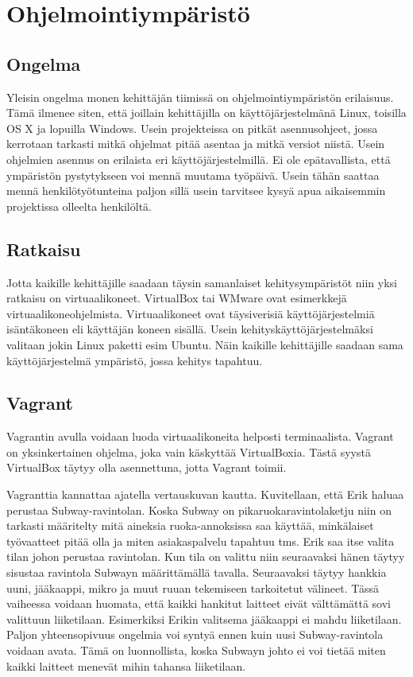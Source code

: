 \chapter{Ohjelmointiympäristö}

\section{Ongelma}
Yleisin ongelma monen kehittäjän tiimissä on ohjelmointiympäristön erilaisuus. Tämä ilmenee siten, että joillain kehittäjilla on käyttöjärjestelmänä Linux, toisilla OS X ja lopuilla Windows. Usein projekteissa on pitkät asennusohjeet, jossa kerrotaan tarkasti mitkä ohjelmat pitää asentaa ja mitkä versiot niistä. Usein ohjelmien asennus on erilaista eri käyttöjärjestelmillä. Ei ole epätavallista, että ympäristön pystytykseen voi mennä muutama työpäivä. Usein tähän saattaa mennä henkilötyötunteina paljon sillä usein tarvitsee kysyä apua aikaisemmin projektissa olleelta henkilöltä. \cite{examplesite}

\section{Ratkaisu}
Jotta kaikille kehittäjille saadaan täysin samanlaiset kehitysympäristöt niin yksi ratkaisu on virtuaalikoneet. VirtualBox tai WMware ovat esimerkkejä virtuaalikoneohjelmista. Virtuaalikoneet ovat täysiverisiä käyttöjärjestelmiä isäntäkoneen eli käyttäjän koneen sisällä. Usein kehityskäyttöjärjestelmäksi valitaan jokin Linux paketti esim Ubuntu. Näin kaikille kehittäjille saadaan sama käyttöjärjestelmä ympäristö, jossa kehitys tapahtuu.

\section{Vagrant}
Vagrantin avulla voidaan luoda virtuaalikoneita helposti terminaalista. Vagrant on yksinkertainen ohjelma, joka vain käskyttää VirtualBoxia. Tästä syystä VirtualBox täytyy olla asennettuna, jotta Vagrant toimii.

Vagranttia kannattaa ajatella vertauskuvan kautta. Kuvitellaan, että Erik haluaa perustaa Subway-ravintolan. Koska Subway on pikaruokaravintolaketju niin on tarkasti määritelty mitä aineksia ruoka-annoksissa saa käyttää, minkälaiset työvaatteet pitää olla ja miten asiakaspalvelu tapahtuu tms. Erik saa itse valita tilan johon perustaa ravintolan. Kun tila on valittu niin seuraavaksi hänen täytyy sisustaa ravintola Subwayn määrittämällä tavalla. Seuraavaksi täytyy hankkia uuni, jääkaappi, mikro ja muut ruuan tekemiseen tarkoitetut välineet. Tässä vaiheessa voidaan huomata, että kaikki hankitut laitteet eivät välttämättä sovi valittuun liiketilaan. Esimerkiksi Erikin valitsema jääkaappi ei mahdu liiketilaan. Paljon yhteensopivuus ongelmia voi syntyä ennen kuin uusi Subway-ravintola voidaan avata. Tämä on luonnollista, koska Subwayn johto ei voi tietää miten kaikki laitteet menevät mihin tahansa liiketilaan.

